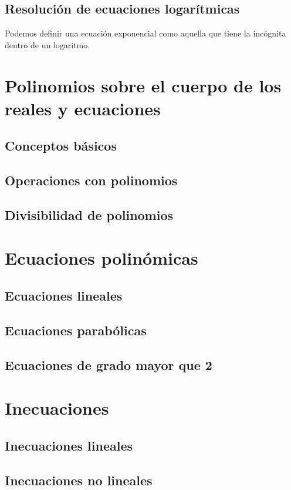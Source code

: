 \newpage
\section{Resolución de ecuaciones logarítmicas}
\begin{defi}
Podemos definir una ecuación exponencial como aquella que tiene la incógnita dentro de un logaritmo.
\end{defi}



\chapter{Polinomios sobre el cuerpo de los reales y ecuaciones}

\minitoc

\section{Conceptos básicos}
\section{Operaciones con polinomios}
\section{Divisibilidad de polinomios}

\chapter{Ecuaciones polinómicas}
\minitoc

\section{Ecuaciones lineales}
\section{Ecuaciones parabólicas}
\section{Ecuaciones de grado mayor que 2}

\chapter{Inecuaciones}
\minitoc

\section{Inecuaciones lineales}
\section{Inecuaciones no lineales}


